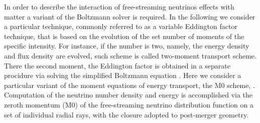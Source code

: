 In order to describe the interaction of free-streaming neutrinos effects with matter a variant of the 
Boltzmann solver is required. In the following we consider a particular technique, 
commonly referred to as a variable Eddington factor technique, that is based on the evolution 
of the set number of moments of the specific intensity. For instance, if the number is two, namely, the
energy density and flux density are evolved, such scheme is called two-moment transport scheme.
There the second moment, the Eddington factor is obtained in a separate procidure via solving 
the simplified Boltzmann equation \citep{(e.g. Mihalas & Mihalas, 1984)}.
%
Here we consider a particular variant of the moment equations of energy transport, 
the M0 scheme, \citep{Radice:2016dwd,Radice:2018pdn}.
Computation of the neutrino number density and energy is 
accomplished via the zeroth momentum (M0) of the free-streaming neutrino distribution 
function on a set of individual radial rays, with the closure adopted to post-merger geometry.


